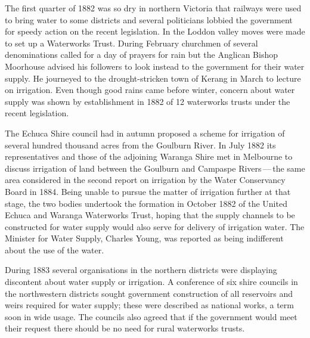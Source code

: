 The first quarter of 1882 was so dry in northern Victoria that
railways were used to bring water to some districts and several
politicians lobbied the government for speedy action on the recent
legislation.  In the Loddon valley  moves were
made to set up a Waterworks Trust.  During February churchmen of
several denominations called for a day of prayers for rain but the
Anglican Bishop Moorhouse
advised his followers to look instead to the government for their
water supply.  He journeyed to the drought-stricken town of Kerang
 in
March to lecture on irrigation.  Even though good rains came before
winter, concern about water supply was shown by establishment in 1882
of 12 waterworks trusts under the recent  legislation.

The Echuca Shire  council had in autumn proposed a
scheme for irrigation of several hundred thousand acres from the
Goulburn River. In July 1882 its representatives and those of the
adjoining Waranga \index{Waranga, Vic.} Shire met in Melbourne to
discuss irrigation of land between the Goulburn and Campaspe
Rivers\,---\,the same area considered in the second report on
irrigation by the Water Conservancy Board in 1884. Being unable to
pursue the matter of irrigation further at that stage, the two bodies
undertook the formation in October 1882 of the United Echuca and
Waranga Waterworks Trust, hoping that the supply channels to be
constructed for water supply would also serve for delivery of
irrigation water.  The Minister for Water Supply, Charles Young,
\index{Young, C.} was reported as being indifferent about the use of
the water.

During 1883 several organisations in the northern districts were
displaying discontent about water supply or irrigation.  A conference
of six shire councils in the northwestern districts sought government
construction of all reservoirs and weirs required for water supply;
these were described as national works, a term soon in wide usage.
The councils also agreed that if the government would meet their
request there should be no need for rural waterworks
trusts.

